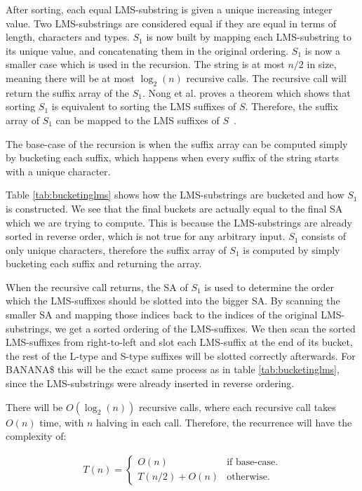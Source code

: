 After sorting, each equal LMS-substring is given a unique increasing integer value. Two
LMS-substrings are considered equal if they are equal in terms of length, characters and
types. $S_1$ is now built by mapping each LMS-substring to its unique value, and
concatenating them in the original ordering. $S_1$ is now a smaller case which is used in
the recursion. The string is at most $n / 2$ in size, meaning there will be at most
$\log_2(n)$ recursive calls. The recursive call will return the suffix array of the $S_1$.
Nong et al. proves a theorem which shows that sorting $S_1$ is
equivalent to sorting the LMS suffixes of $S$. Therefore, the suffix array of $S_1$ can be
mapped to the LMS suffixes of $S$~\cite{LinearTimeSuffixArraySAIS}.

The base-case of the recursion is when the suffix array can be computed simply by
bucketing each suffix, which happens when every suffix of the string starts with a unique
character. 

Table \ref{tab:bucketinglms} shows how the LMS-substrings are bucketed and how $S_1$ is
constructed. We see that the final buckets are actually equal to the final SA which we are
trying to compute. This is because the LMS-substrings are already sorted in reverse order,
which is not true for any arbitrary input. $S_1$ consists of only unique characters,
therefore the suffix array of $S_1$ is computed by simply bucketing each suffix and
returning the array.

When the recursive call returns, the SA of $S_1$ is used to determine the order which the
LMS-suffixes should be slotted into the bigger SA. By scanning the smaller SA and mapping
those indices back to the indices of the original LMS-substrings, we get a sorted ordering
of the LMS-suffixes. We then scan the sorted LMS-suffixes from right-to-left and slot each
LMS-suffix at the end of its bucket, the rest of the L-type and S-type suffixes will be
slotted correctly afterwards. For BANANA\$ this will be the exact same process as in table
\ref{tab:bucketinglms}, since the LMS-substrings were already inserted in reverse
ordering.

There will be $O(\log_2(n))$ recursive calls, where each recursive call takes $O(n)$ time,
with $n$ halving in each call. Therefore, the recurrence will have the complexity of:

\begin{gather*}
    T(n) =
\begin{cases}
    O(n) & \text{if base-case.} \\
    T(n / 2) + O(n) & \text{otherwise.}
\end{cases}
\end{gather*}

